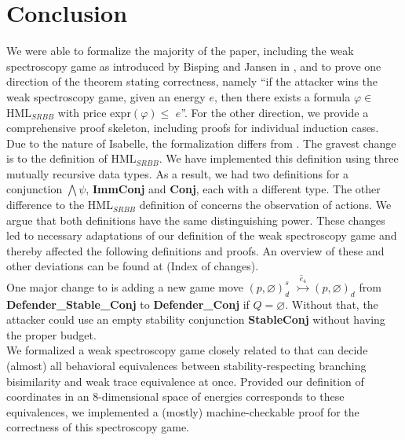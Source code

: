 \section{Conclusion}
We were able to formalize the majority of the paper, including the weak spectroscopy game as introduced by Bisping and Jansen in \cite{bisping2023lineartimebranchingtime}, 
and to prove one direction of the theorem stating correctness, namely ``if the attacker wins the weak spectroscopy game, given an energy $e$, then there exists a formula $\varphi \in$ HML$_{SRBB}$ with price expr$(\varphi) \leq$ $e$''. 
For the other direction, we provide a comprehensive proof skeleton, including proofs for individual induction cases.
\\
Due to the nature of Isabelle, the formalization differs from \cite{bisping2023lineartimebranchingtime}. The gravest change is to the definition of HML$_{SRBB}$. 
We have implemented this definition using three mutually recursive data types. As a result, we had two definitions for a conjunction $\bigwedge\psi$, \textbf{ImmConj} and \textbf{Conj}, each with a different type. 
The other difference to the HML$_{SRBB}$ definition of \cite{bisping2023lineartimebranchingtime} concerns the observation of actions. 
We argue that both definitions have the same distinguishing power. 
These changes led to necessary adaptations of our definition of the weak spectroscopy game and thereby affected the following definitions and proofs.
An overview of these and other deviations can be found at (Index of changes). 
\\
One major change to \cite{bisping2023lineartimebranchingtime} is adding a new game move $(p,\varnothing)_{d}^{s}$ $\overset{\hat{e}_4}{\rightarrowtail} (p,\varnothing)_d$ from \textbf{Defender\_Stable\_Conj} to \textbf{Defender\_Conj} if $Q = \varnothing$. 
Without that, the attacker could use an empty stability conjunction \textbf{StableConj} without having the proper budget. 
\\
We formalized a weak spectroscopy game closely related to \cite{bisping2023lineartimebranchingtime} that can decide (almost) all behavioral equivalences between stability-respecting branching bisimilarity and weak trace equivalence at once.
Provided our definition of coordinates in an 8-dimensional space of energies corresponds to these equivalences, we implemented a (mostly) machine-checkable proof for the correctness of this spectroscopy game.

